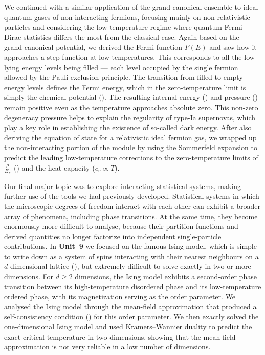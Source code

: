 We continued with a similar application of the grand-canonical ensemble to ideal quantum gases of non-interacting fermions, focusing mainly on non-relativistic particles and considering the low-temperature regime where quantum Fermi--Dirac statistics differs the most from the classical case.
Again based on the grand-canonical potential, we derived the Fermi function $F(E)$ and saw how it approaches a step function at low temperatures.
This corresponds to all the low-lying energy levels being filled --- each level occupied by the single fermion allowed by the Pauli exclusion principle.
The transition from filled to empty energy levels defines the Fermi energy, which in the zero-temperature limit is simply the chemical potential ().
The resulting internal energy () and pressure () remain positive even as the temperature approaches absolute zero.
This non-zero degeneracy pressure helps to explain the regularity of type-Ia supernovas, which play a key role in establishing the existence of so-called dark energy.
After also deriving the equation of state for a relativistic ideal fermion gas, we wrapped up the non-interacting portion of the module by using the Sommerfeld expansion to predict the leading low-temperature corrections to the zero-temperature limits of $\frac{\mu}{E_F}$ () and the heat capacity ($c_v \propto T$).

Our final major topic was to explore interacting statistical systems, making further use of the tools we had previously developed.
Statistical systems in which the microscopic degrees of freedom interact with each other can exhibit a broader array of phenomena, including phase transitions.
At the same time, they become enormously more difficult to analyse, because their partition functions and derived quantities no longer factorize into independent single-particle contributions.
In \textbf{Unit~9} we focused on the famous Ising model, which is simple to write down as a system of spins interacting with their nearest neighbours on a $d$-dimensional lattice (), but extremely difficult to solve exactly in two or more dimensions.
For $d \geq 2$ dimensions, the Ising model exhibits a second-order phase transition between its high-temperature disordered phase and its low-temperature ordered phase, with its magnetization serving as the order parameter.
We analysed the Ising model through the mean-field approximation that produced a self-consistency condition () for this order parameter.
We then exactly solved the one-dimensional Ising model and used Kramers--Wannier duality to predict the exact critical temperature in two dimensions, showing that the mean-field approximation is not very reliable in a low number of dimensions.

